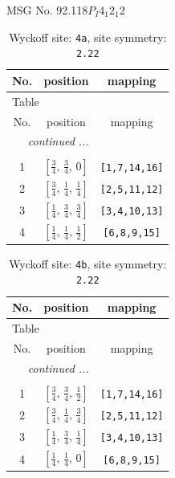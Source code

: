 \documentclass[fleqn,8pt]{jsarticle}
\begin{document}
\setcounter{MaxMatrixCols}{32}

\renewcommand{\tablename}{Table~}
\renewcommand{\figurename}{Figure~}
\begin{center}
\LARGE
MSG No. 92.118\quad$P_{I}4_{1}2_{1}2$
\end{center}
\renewcommand{\arraystretch}{1.2}
\begin{longtable}{ccc}
\caption{Wyckoff site: {\tt 4a}, site symmetry: {\tt 2.22}}
 \\
 \hline \hline
No. & position & mapping \\ \hline \endfirsthead

\multicolumn{2}{l}{\tablename\ \thetable{}} \\
 \hline \hline
No. & position & mapping \\ \hline \endhead

 \hline \hline
\multicolumn{2}{r}{\footnotesize\it continued ...} \\ \endfoot

 \hline \hline
\multicolumn{2}{r}{} \\ \endlastfoot

1 & $\left[ \frac{3}{4},\, \frac{3}{4},\, 0 \right]$ & {\tt [1,7,14,16]} \\ \hline
2 & $\left[ \frac{3}{4},\, \frac{1}{4},\, \frac{1}{4} \right]$ & {\tt [2,5,11,12]} \\ \hline
3 & $\left[ \frac{1}{4},\, \frac{3}{4},\, \frac{3}{4} \right]$ & {\tt [3,4,10,13]} \\ \hline
4 & $\left[ \frac{1}{4},\, \frac{1}{4},\, \frac{1}{2} \right]$ & {\tt [6,8,9,15]} \\
\end{longtable}
\renewcommand{\arraystretch}{1.2}
\begin{longtable}{ccc}
\caption{Wyckoff site: {\tt 4b}, site symmetry: {\tt 2.22}}
 \\
 \hline \hline
No. & position & mapping \\ \hline \endfirsthead

\multicolumn{2}{l}{\tablename\ \thetable{}} \\
 \hline \hline
No. & position & mapping \\ \hline \endhead

 \hline \hline
\multicolumn{2}{r}{\footnotesize\it continued ...} \\ \endfoot

 \hline \hline
\multicolumn{2}{r}{} \\ \endlastfoot

1 & $\left[ \frac{3}{4},\, \frac{3}{4},\, \frac{1}{2} \right]$ & {\tt [1,7,14,16]} \\ \hline
2 & $\left[ \frac{3}{4},\, \frac{1}{4},\, \frac{3}{4} \right]$ & {\tt [2,5,11,12]} \\ \hline
3 & $\left[ \frac{1}{4},\, \frac{3}{4},\, \frac{1}{4} \right]$ & {\tt [3,4,10,13]} \\ \hline
4 & $\left[ \frac{1}{4},\, \frac{1}{4},\, 0 \right]$ & {\tt [6,8,9,15]} \\
\end{longtable}
\end{document}
